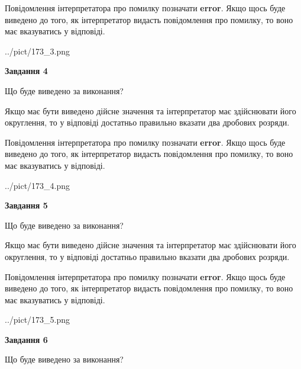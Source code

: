 \documentclass[12pt, ukrainian]{article}
\begin{document}
{\begin {Large}
Повідомлення інтерпретатора про помилку позначати \textbf{error}.
Якщо щось буде виведено до того, як інтерпретатор видасть повідомлення про помилку, 
то воно має вказуватись у відповіді. \par

\begin{center}
	{../pict/173_3.png}
\end{center}
\newpage

{\begin {center}\textbf{Завдання 4}\end {center}}\par
Що буде виведено за виконання? \par

Якщо має бути виведено дійсне значення та інтерпретатор має здійснювати його округлення, 
то у відповіді достатньо правильно вказати два дробових розряди.

Повідомлення інтерпретатора про помилку позначати \textbf{error}.
Якщо щось буде виведено до того, як інтерпретатор видасть повідомлення про помилку, 
то воно має вказуватись у відповіді. \par

\begin{center}
	{../pict/173_4.png}
\end{center}
\newpage

{\begin {center}\textbf{Завдання 5}\end {center}}\par
Що буде виведено за виконання? \par

Якщо має бути виведено дійсне значення та інтерпретатор має здійснювати його округлення, 
то у відповіді достатньо правильно вказати два дробових розряди.

Повідомлення інтерпретатора про помилку позначати \textbf{error}.
Якщо щось буде виведено до того, як інтерпретатор видасть повідомлення про помилку, 
то воно має вказуватись у відповіді. \par

\begin{center}
	{../pict/173_5.png}
\end{center}
\newpage

{\begin {center}\textbf{Завдання 6}\end {center}}\par
Що буде виведено за виконання? \par


\end{Large}}
\end{document}
